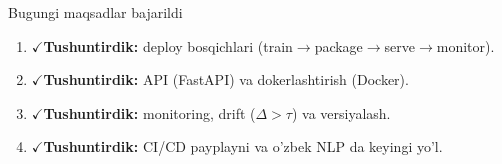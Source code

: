 \documentclass[aspectratio=169,11pt]{beamer}
\newcommand{\bajarildi}{{\color{deepgreen}\large$\checkmark$}\;}
\begin{document}
\begin{frame}{Bugungi maqsadlar bajarildi}
  \begin{enumerate}\setlength\itemsep{7pt}
    \item \bajarildi \textbf{Tushuntirdik:} deploy bosqichlari
          (train$\to$package$\to$serve$\to$monitor).
    \item \bajarildi \textbf{Tushuntirdik:} API (FastAPI) va dokerlashtirish (Docker).
    \item \bajarildi \textbf{Tushuntirdik:} monitoring, drift ($\Delta>\tau$) va versiyalash.
    \item \bajarildi \textbf{Tushuntirdik:} CI/CD payplayni va o'zbek NLP da
          keyingi yo'l.
  \end{enumerate}
\end{frame}
\end{document}
